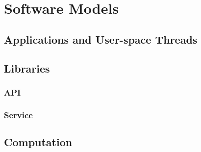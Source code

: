 
\chapter{Software Models}
\label{chapter:software}

\section{Applications and User-space Threads}

\section{Libraries}

\subsection{API}

\subsection{Service}

\section{Computation}


